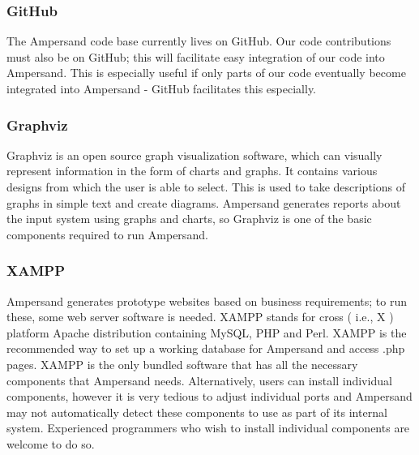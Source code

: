 \documentclass[12pt]{report}
\begin{document}
\subsubsection*{GitHub}
The Ampersand code base currently lives on GitHub. Our code contributions must
also be on GitHub; this will facilitate easy integration of our code into
Ampersand. This is especially useful if only parts of our code eventually become
integrated into Ampersand - GitHub facilitates this especially. 
%

\subsubsection*{Graphviz}
Graphviz is an open source graph visualization software, which can
visually represent information in the form of charts and graphs. It contains
various designs from which the user is able to select. This is used to take
descriptions of graphs in simple text and create diagrams. Ampersand generates
reports about the input system using graphs and charts, so Graphviz is one of the
basic components required to run Ampersand.

\subsubsection*{XAMPP}
Ampersand generates prototype websites based on business requirements; to run
these, some web server software is needed. XAMPP stands for cross \big( i.e., X
\big) platform Apache distribution containing MySQL, PHP and Perl. XAMPP \cite{xampp} is the
recommended way
to set up a working database for Ampersand and access .php
pages. XAMPP is the only bundled software that has all the necessary components 
that Ampersand needs. Alternatively, users can install individual components, 
however it is very tedious to adjust individual ports and Ampersand may not  
automatically detect these components to use as part of its internal system. 
Experienced programmers who wish to install individual components are welcome 
to do so.

%
\end{document}
